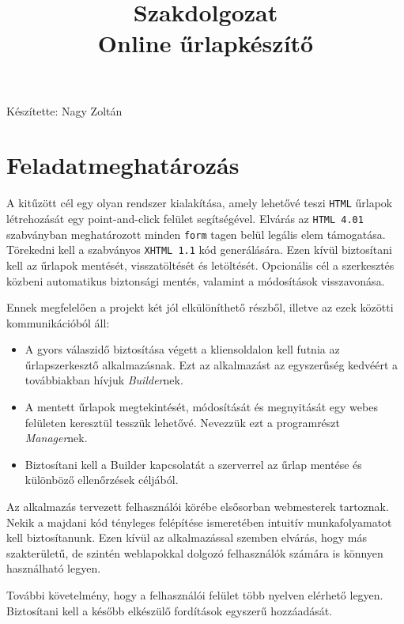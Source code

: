 \documentclass[12pt,a4paper,twoside]{article}
\title{Szakdolgozat\\\normalsize Online űrlapkészítő}
\author{} %
\begin{document}
\maketitle\thispagestyle{empty}
\vspace{17cm}
\hspace{8cm}
Készítette: Nagy Zoltán
\clearpage

\setcounter{tocdepth}{3}
\tableofcontents

\clearpage
{}
\section{Feladatmeghatározás}

A kitűzött cél egy olyan rendszer kialakítása, amely lehetővé teszi
\texttt{HTML} űrlapok létrehozását egy point-and-click felület
segítségével. Elvárás az \texttt{HTML 4.01} szabványban meghatározott minden
\texttt{form} tagen belül legális elem támogatása. Törekedni kell a szabványos
\texttt{XHTML 1.1} kód generálására. Ezen kívül biztosítani kell
az űrlapok mentését, visszatöltését és letöltését. Opcionális cél a szerkesztés
közbeni automatikus biztonsági mentés, valamint a módosítások visszavonása.

Ennek megfelelően a projekt két jól elkülöníthető részből, illetve az ezek
közötti kommunikációból áll:
\begin{itemize}
\item A gyors válaszidő biztosítása végett a kliensoldalon kell futnia az
  űrlapszerkesztő alkalmazásnak. Ezt az alkalmazást az egyszerűség kedvéért a
  továbbiakban hívjuk \textit{Builder}nek.
\item A mentett űrlapok megtekintését, módosítását és megnyitását egy
  webes felületen keresztül tesszük lehetővé. Nevezzük ezt a programrészt
  \textit{Manager}nek.
\item Biztosítani kell a Builder kapcsolatát a szerverrel az űrlap mentése és
  különböző ellenőrzések céljából.
\end{itemize}

Az alkalmazás tervezett felhasználói körébe elsősorban webmesterek
tartoznak. Nekik a majdani kód tényleges felépítése ismeretében intuitív munkafolyamatot
kell biztosítanunk. Ezen kívül az alkalmazással szemben elvárás, hogy más
szakterületű, de szintén weblapokkal dolgozó felhasználók számára is könnyen
használható legyen.

További követelmény, hogy a felhasználói felület több nyelven elérhető
legyen. Biztosítani kell a később elkészülő fordítások egyszerű hozzáadását.
\end{document}
